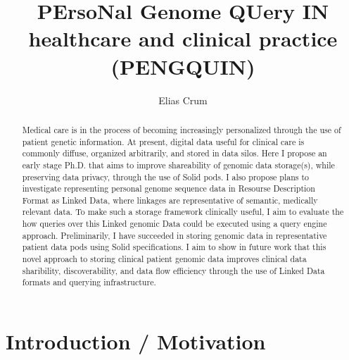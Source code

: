 \documentclass[runningheads]{llncs}
\begin{document}
\title{PErsoNal Genome QUery IN healthcare and clinical practice (PENGQUIN)}

\author{Elias Crum}



\maketitle

\begin{abstract}
	Medical care is in the process of becoming increasingly personalized through the use of patient genetic information. 
	At present, digital data useful for clinical care is commonly diffuse, organized arbitrarily, and stored in data silos. 
	Here I propose an early stage Ph.D. that aims to improve shareability of genomic data storage(s), while preserving data privacy, through the use of Solid pods. 
	I also propose plans to investigate representing personal genome sequence data in Resourse Description Format as Linked Data, where linkages are representative of semantic, medically relevant data.
	To make such a storage framework clinically useful, I aim to evaluate the how queries over this Linked genomic Data could be executed using a query engine approach.
	Preliminarily, I have succeeded in storing genomic data in representative patient data pods using Solid specifications. 
	I aim to show in future work that this novel approach to storing clinical patient genomic data improves clinical data sharibility, discoverability, and data flow efficiency through the use of Linked Data formats and querying infrastructure. 


\end{abstract}


\section{Introduction / Motivation}

\end{document}
